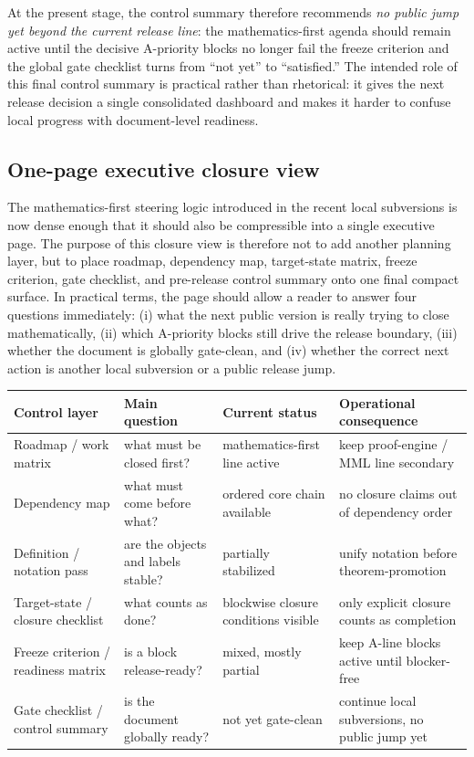 \documentclass[12pt,a4paper]{article}
\begin{document}
At the present stage, the control summary therefore recommends \emph{no public jump yet beyond the current release line}: the mathematics-first agenda should remain active until the decisive A-priority blocks no longer fail the freeze criterion and the global gate checklist turns from ``not yet'' to ``satisfied.'' The intended role of this final control summary is practical rather than rhetorical: it gives the next release decision a single consolidated dashboard and makes it harder to confuse local progress with document-level readiness.


\subsection*{One-page executive closure view}
The mathematics-first steering logic introduced in the recent local subversions is now dense enough that it should also be compressible into a single executive page. The purpose of this closure view is therefore not to add another planning layer, but to place roadmap, dependency map, target-state matrix, freeze criterion, gate checklist, and pre-release control summary onto one final compact surface. In practical terms, the page should allow a reader to answer four questions immediately: (i) what the next public version is really trying to close mathematically, (ii) which A-priority blocks still drive the release boundary, (iii) whether the document is globally gate-clean, and (iv) whether the correct next action is another local subversion or a public release jump.

\begin{center}
\begin{tabular}{P{0.22\textwidth} P{0.22\textwidth} P{0.18\textwidth} P{0.24\textwidth}}
\toprule
\textbf{Control layer} & \textbf{Main question} & \textbf{Current status} & \textbf{Operational consequence}\\
\midrule
Roadmap / work matrix & what must be closed first? & mathematics-first line active & keep proof-engine / MML line secondary\\
Dependency map & what must come before what? & ordered core chain available & no closure claims out of dependency order\\
Definition / notation pass & are the objects and labels stable? & partially stabilized & unify notation before theorem-promotion\\
Target-state / closure checklist & what counts as done? & blockwise closure conditions visible & only explicit closure counts as completion\\
Freeze criterion / readiness matrix & is a block release-ready? & mixed, mostly partial & keep A-line blocks active until blocker-free\\
Gate checklist / control summary & is the document globally ready? & not yet gate-clean & continue local subversions, no public jump yet\\
\bottomrule
\end{tabular}
\end{center}
\end{document}
